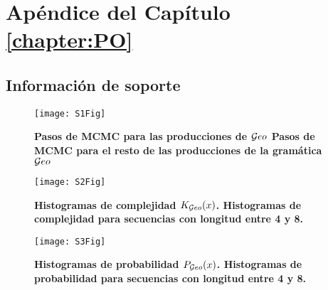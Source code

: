 \chapter{Apéndice del Capítulo \ref{chapter:PO}}

\section{Información de soporte}

\begin{figure}[htpb]
    \centering
    \texttt{[image: S1Fig]}
    \caption{\bf{Pasos de MCMC para las producciones de $\mathcal Geo$} Pasos de MCMC para el resto de las producciones de la gramática $\mathcal Geo$}
    \label{S1_Fig}
\end{figure}

\begin{figure}[htpb]
    \centering
    \texttt{[image: S2Fig]}
    \caption{\bf{Histogramas de complejidad $K_{\mathcal Geo}(x)$}. Histogramas de complejidad para secuencias con longitud entre 4 y 8.}
    \label{S2_Fig}
\end{figure}

\begin{figure}[htpb]
    \centering
    \texttt{[image: S3Fig]}
    \caption{\bf{Histogramas de probabilidad $P_{\mathcal Geo}(x)$}. Histogramas de probabilidad para secuencias con longitud entre 4 y 8.}
    \label{S3_Fig}
\end{figure}